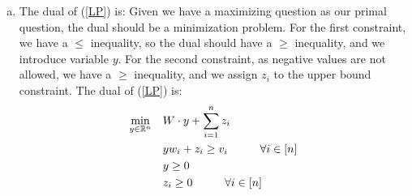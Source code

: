 \documentclass[10pt]{article}
\begin{document}
\begin{solution}
\begin{enumerate}[(a)]
            \\\\\\\\\\\\\\\\\\
        \item The dual of (\ref{LP}) is: Given we have a maximizing question as our primal question, the dual should be a minimization problem. For the first constraint, we have a $\leq$ inequality, so the dual should have a $\geq$ inequality, and we introduce variable $y$. For the second constraint, as negative values are not allowed, we have a $\geq$ inequality, and we assign $z_i$ to the upper bound constraint. The dual of (\ref{LP}) is:
            \begin{align*}
                \min_{y \in \mathbb{R}^n} \quad & W \cdot y + \sum_{i=1}^n{z_i}\\
                & yw_i + z_i \geq v_i \hspace*{1cm} \forall i \in [n]\\
                & y \geq 0\\
                &z_i \geq 0 \hspace*{1cm} \forall i \in [n]
            \end{align*}
    \end{enumerate}
\end{solution}

\newpage
\end{document}
